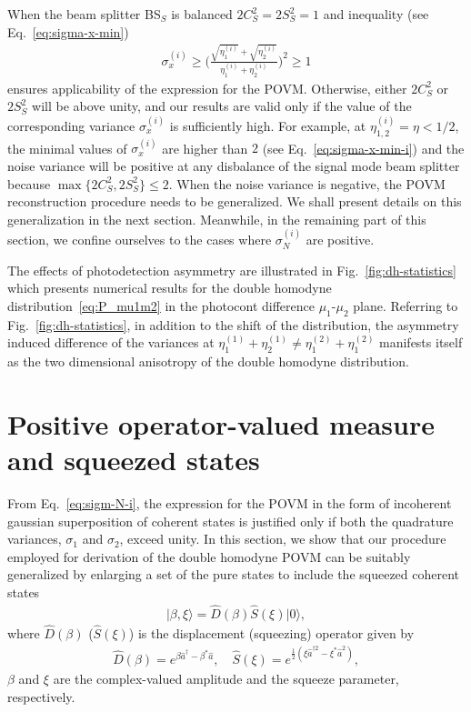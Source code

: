 \documentclass[%
reprint,
superscriptaddress,
 amsmath,amssymb,amsfonts,
 aps,
 pra,
 longbibliography
]{revtex4-2}
\newcommand{\ket}[1]{\ensuremath{|{#1}\rangle}}
\newcommand{\hcnj}[1]{{#1}^{\dagger}}
\begin{document}
When the beam splitter BS$_S$
is balanced $2 C_S^2=2 S_S^2=1$
and inequality (see Eq.~\eqref{eq:sigma-x-min})
\begin{align}
  \label{eq:sigma-x-min-i}
  \sigma_x^{(i)}\ge \Biggl(
\frac{\sqrt{\eta_1^{(i)}}+\sqrt{\eta_2^{(i)}}}{\eta_1^{(i)}+\eta_2^{(i)}}
  \Biggr)^2\ge 1
\end{align}
ensures applicability of the expression for the POVM.
Otherwise, either $2 C_S^2$ or $2 S_S^2$ will be above unity,
and our results are valid only if
the value of the corresponding variance $\sigma_x^{(i)}$ is sufficiently high.
For example, at $\eta_{1,2}^{(i)}=\eta<1/2$,
the minimal values of $\sigma_x^{(i)}$ are higher than $2$
(see Eq.~\eqref{eq:sigma-x-min-i})
and the noise variance will be positive at
any disbalance of the signal mode beam splitter
because $\max\{2 C_S^2,2 S_S^2\}\le 2$.
When the noise variance is negative,
the POVM reconstruction procedure
needs to be generalized.
We shall present details on this generalization
in the next section.
Meanwhile,
in the remaining part of this section,
we confine ourselves to the cases where $\sigma_N^{(i)}$ are positive.

The effects of photodetection asymmetry
are illustrated in Fig.~\ref{fig:dh-statistics}
which presents numerical results for
the double homodyne distribution~\eqref{eq:P_mu1m2}
in the photocont difference $\mu_1$-$\mu_2$ plane.
Referring to Fig.~\ref{fig:dh-statistics},
in addition to the shift of the distribution,
the asymmetry induced difference of the variances
at $\eta_1^{(1)}+\eta_2^{(1)}\ne \eta_1^{(2)}+\eta_1^{(2)}$
manifests itself as the two dimensional anisotropy
of the double homodyne distribution.

\section{Positive operator-valued measure and squeezed states}
\label{sec:gen-POVM}

From Eq.~\eqref{eq:sigm-N-i},
the expression for the POVM
in the form of incoherent gaussian superposition
of coherent states is justified only if
both the quadrature variances, $\sigma_1$ and $\sigma_2$,
exceed unity.
In this section, we show that our procedure employed
for derivation of the double homodyne POVM can be
suitably generalized by enlarging a set of the pure states to include
the squeezed coherent states
\begin{align}
  \label{eq:squeezed-def}
  \ket{\beta,\xi}=\hat{D}(\beta)\hat{S}(\xi)\ket{0},
\end{align}
where $\hat{D}(\beta)$ ($\hat{S}(\xi)$) is the displacement
(squeezing) operator  given by
\begin{align}
\label{eq:D-S-def}
\hat{D}(\beta) =
e^{\beta\hcnj{\hat{a}}-\beta^*\hat{a}}, \quad
    \hat{S}(\xi)=e^{\frac{1}{2}\left(\xi\hat{a}^{\dag2}-\xi^*\hat{a}^2\right)},
\end{align}
$\beta$ and $\xi$ are the complex-valued amplitude
and the squeeze parameter, respectively. 
\end{document}
